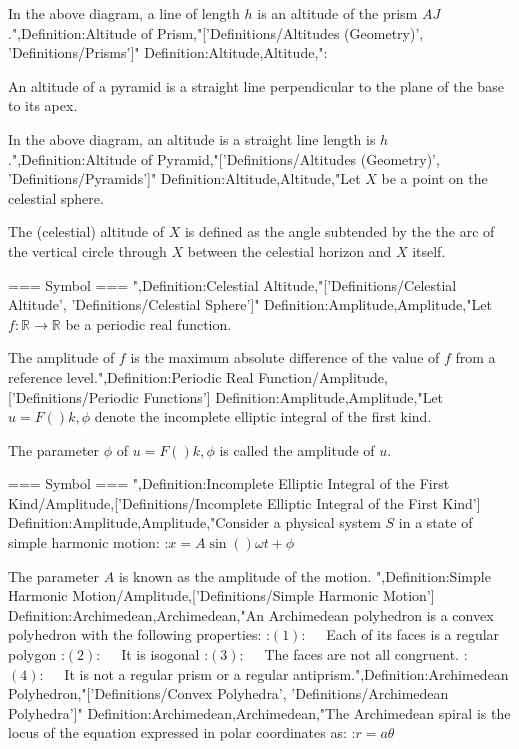 In the above diagram, a line of length $h$ is an altitude of the prism $AJ$.",Definition:Altitude of Prism,"['Definitions/Altitudes (Geometry)', 'Definitions/Prisms']"
Definition:Altitude,Altitude,":

An altitude of a pyramid is a straight line perpendicular to the plane of the base to its apex.

In the above diagram, an altitude is a straight line length is $h$.",Definition:Altitude of Pyramid,"['Definitions/Altitudes (Geometry)', 'Definitions/Pyramids']"
Definition:Altitude,Altitude,"Let $X$ be a point on the celestial sphere.

The (celestial) altitude of $X$ is defined as the angle subtended by the the arc of the vertical circle through $X$ between the celestial horizon and $X$ itself.


=== Symbol ===
",Definition:Celestial Altitude,"['Definitions/Celestial Altitude', 'Definitions/Celestial Sphere']"
Definition:Amplitude,Amplitude,"Let $f: \mathbb R \to \mathbb R$ be a periodic real function.


The amplitude of $f$ is the maximum absolute difference of the value of $f$ from a reference level.",Definition:Periodic Real Function/Amplitude,['Definitions/Periodic Functions']
Definition:Amplitude,Amplitude,"Let $u = F \left(   \right){k, \phi}$ denote the incomplete elliptic integral of the first kind.

The parameter $\phi$ of $u = F \left(   \right){k, \phi}$ is called the amplitude of $u$.


=== Symbol ===
",Definition:Incomplete Elliptic Integral of the First Kind/Amplitude,['Definitions/Incomplete Elliptic Integral of the First Kind']
Definition:Amplitude,Amplitude,"Consider a physical system $S$ in a state of simple harmonic motion:
:$x = A \sin \left(   \right){\omega t + \phi}$


The parameter $A$ is known as the amplitude of the motion.
",Definition:Simple Harmonic Motion/Amplitude,['Definitions/Simple Harmonic Motion']
Definition:Archimedean,Archimedean,"An Archimedean polyhedron is a convex polyhedron with the following properties:
:$(1): \quad$ Each of its faces is a regular polygon
:$(2): \quad$ It is isogonal
:$(3): \quad$ The faces are not all congruent.
:$(4): \quad$ It is not a regular prism or a regular antiprism.",Definition:Archimedean Polyhedron,"['Definitions/Convex Polyhedra', 'Definitions/Archimedean Polyhedra']"
Definition:Archimedean,Archimedean,"The Archimedean spiral is the locus of the equation expressed in polar coordinates as:
:$r = a \theta$


